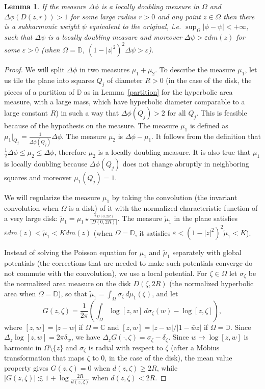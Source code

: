 \documentclass[12pt,twoside,final,psamsfonts]{amsart}
\theoremstyle{plain}
\newtheorem{lema}{Lemma}
\theoremstyle{remark}
\theoremstyle{definition}
\newcommand{\C}{{\mathbb C}}
\newcommand{\D}{{\mathbb D}}
\begin{document}
\begin{lema}\label{regularitzacio}
If the measure $\Delta\phi$ is a locally 
doubling measure in $\Omega$  and $\Delta
\phi(D(z,r))>1$ for  some large radius $r>0$ and any point $z\in\Omega$ then
there is a subharmonic  weight $\psi$ equivalent to the original, i.e.
$\sup_\Omega |\phi-\psi|<+\infty$,  such that $\Delta \psi$ is a locally 
doubling
measure and moreover  $\Delta\psi >\varepsilon dm(z)$ for some $\varepsilon>0$
(when $\Omega=\D$, $(1-|z|^2)^2\Delta\psi>\varepsilon$).
\end{lema}

\begin{proof}
We will split $\Delta \phi$ in two measures $\mu_1+\mu_2$.   To
describe the measure $\mu_1$,  let us tile the plane into squares
$Q_j$ of diameter $R>0$ (in the case of the disk, the pieces of a partition
of $\D$ as in Lemma~\ref{partition} for the hyperbolic area measure, with a
large mass, which have hyperbolic diameter comparable to a large constant $R$) in such a way
that $\Delta\phi(Q_j)>2$ for all  $Q_j$. This is feasible because of the
hypothesis on the measure. The measure  $\mu_1$ is defined as
$\mu_1|_{Q_j}=\frac 1{\Delta\phi(Q_j)}\Delta\phi$.  The measure $\mu_2$ is
$\Delta\phi-\mu_1$. 
It follows from the definition that  $\frac 12 \Delta\phi \le \mu_2\le
\Delta\phi$, therefore $\mu_2$ is a locally
doubling  measure. It is also true that $\mu_1$ is locally doubling
 because $\Delta\phi(Q_j)$ does not change abruptly in neighboring
squares
 and moreover $\mu_1(Q_j)=1$.  

We will regularize the measure $\mu_1$ by taking the convolution  (the
invariant convolution when $\Omega$ is a disk) of it  with the normalized
characteristic
function of a very large disk: $\widetilde \mu_1= \mu_1 \star
\frac{\chi_{D(0,2R)}}{|D(0,2R)|}$. The measure  $\widetilde\mu_1$ in the plane 
satisfies
$\varepsilon dm(z) <\widetilde \mu_1<K dm(z)$ (when $\Omega=\D$, it satisfies
$\varepsilon<(1-|z|^2)^2\widetilde\mu_1< K$). 

Instead of solving the Poisson equation for $\mu_1$ and $\widetilde\mu_1$
separately with global potentials (the corrections that are needed to make
such potentials converge do not commute with the convolution), we use a local
potential. For $\zeta\in\Omega$ let $\sigma_\zeta$ be the normalized area
measure on the disk $D(\zeta,2R)$ (the normalized hyperbolic area when
$\Omega=\D$), so that $\widetilde\mu_1=\int_\Omega\sigma_\zeta\,d\mu_1(\zeta)$,
and let
\[
G(z,\zeta)=\frac 1{2\pi}\left(\int_\Omega \log[z,w]\,d\sigma_\zeta(w)-\log[z,\zeta]\right),
\]
where $[z,w]=|z-w|$ if $\Omega=\C$ and $[z,w]=|z-w|/|1-\bar wz|$ if
$\Omega=\D$. Since $\Delta_z\log[z,w]=2\pi\delta_w$, we have
$\Delta_zG(\cdot,\zeta)=\sigma_\zeta-\delta_\zeta$. Since $w\mapsto\log[z,w]$ is
harmonic in $\Omega\setminus\{z\}$ and $\sigma_\zeta$ is radial with respect
to $\zeta$ (after a M\"obius transformation that maps $\zeta$ to $0$, in the
case of the disk), the mean value property gives $G(z,\zeta)=0$ when
$d(z,\zeta)\ge 2R$, while $|G(z,\zeta)|\lesssim 1+\log\frac{2R}{d(z,\zeta)}$
when $d(z,\zeta)<2R$.
 

\end{proof}
\end{document}
